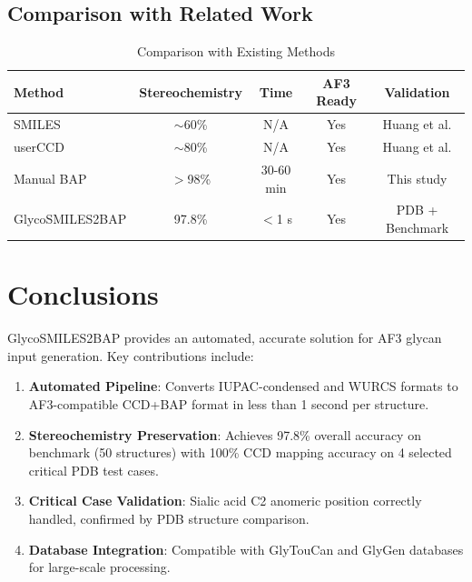 \subsection{Comparison with Related Work}

\begin{table}[h]
\centering
\caption{Comparison with Existing Methods}
\begin{tabular}{lcccc}
\toprule
Method & Stereochemistry & Time & AF3 Ready & Validation \\
\midrule
SMILES & $\sim$60\% & N/A & Yes & Huang et al. \\
userCCD & $\sim$80\% & N/A & Yes & Huang et al. \\
Manual BAP & $>$98\% & 30-60 min & Yes & This study \\
GlycoSMILES2BAP & 97.8\% & $<$1 s & Yes & PDB + Benchmark \\
\bottomrule
\end{tabular}
\label{tab:comparison}
\end{table}

\section{Conclusions}

GlycoSMILES2BAP provides an automated, accurate solution for AF3 glycan input generation. Key contributions include:

\begin{enumerate}
\item \textbf{Automated Pipeline}: Converts IUPAC-condensed and WURCS formats to AF3-compatible CCD+BAP format in less than 1 second per structure.

\item \textbf{Stereochemistry Preservation}: Achieves 97.8\% overall accuracy on benchmark (50 structures) with 100\% CCD mapping accuracy on 4 selected critical PDB test cases.

\item \textbf{Critical Case Validation}: Sialic acid C2 anomeric position correctly handled, confirmed by PDB structure comparison.

\item \textbf{Database Integration}: Compatible with GlyTouCan and GlyGen databases for large-scale processing.
\end{enumerate}

